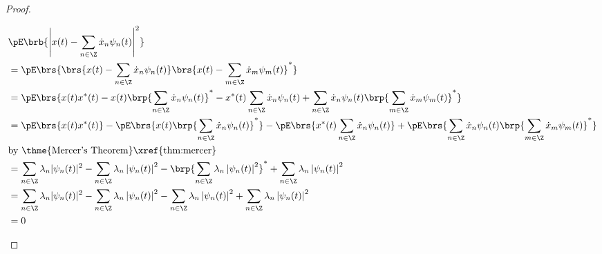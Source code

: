 \begin{proof}
\begin{enumerate}
\begin{align*}
  &\pE\brb{\left| x(t)-\sum_{n\in\Z}\dot{x}_n \psi_n(t) \right|^2}
  \\&= \pE\brs{\brs{ x(t)-\sum_{n\in\Z}\dot{x}_n \psi_n(t) }\brs{ x(t)-\sum_{m\in\Z}\dot{x}_m \psi_m(t) }^\ast}
  \\&= \pE\brs{x(t)x^\ast(t) -x(t)\brp{\sum_{n\in\Z}\dot{x}_n \psi_n(t)}^\ast -x^\ast(t)\sum_{n\in\Z}\dot{x}_n \psi_n(t) + \sum_{n\in\Z}\dot{x}_n \psi_n(t) \brp{\sum_{m\in\Z}\dot{x}_m \psi_m(t) }^\ast }
  \\&= \pE\brs{x(t)x^\ast(t)} -\pE\brs{x(t)\brp{\sum_{n\in\Z}\dot{x}_n \psi_n(t)}^\ast} -\pE\brs{x^\ast(t)\sum_{n\in\Z}\dot{x}_n \psi_n(t)} + \pE\brs{\sum_{n\in\Z}\dot{x}_n \psi_n(t) \brp{\sum_{m\in\Z}\dot{x}_m \psi_m(t) }^\ast }
  \\&\text{by \thme{Mercer's Theorem}\xref{thm:mercer}}
  \\&= \sum_{n\in\Z}\lambda_n |\psi_n(t)|^2 -\sum_{n\in\Z}\lambda_n \left|\psi_n(t) \right|^2  -\brp{\sum_{n\in\Z}\lambda_n \left|\psi_n(t) \right|^2}^\ast + \sum_{n\in\Z}\lambda_n \left|\psi_n(t) \right|^2
  \\&= \sum_{n\in\Z}\lambda_n |\psi_n(t)|^2 -\sum_{n\in\Z}\lambda_n \left|\psi_n(t) \right|^2  -\sum_{n\in\Z}\lambda_n \left|\psi_n(t) \right|^2 + \sum_{n\in\Z}\lambda_n \left|\psi_n(t) \right|^2
  \\&= 0
\end{align*}
\end{enumerate}
\end{proof}


